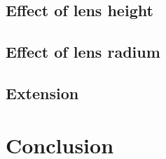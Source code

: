 \subsection{Effect of lens height}


\subsection{Effect of lens radium}

\subsection{Extension}


\section{Conclusion}
%



